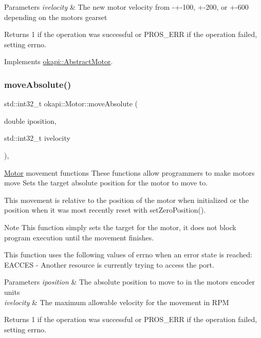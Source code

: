 \begin{DoxyParams}{Parameters}
{\em ivelocity} & The new motor velocity from -\/+-\/100, +-\/200, or +-\/600 depending on the motor\textquotesingle{}s gearset \\
\hline
\end{DoxyParams}
\begin{DoxyReturn}{Returns}
1 if the operation was successful or P\+R\+O\+S\+\_\+\+E\+RR if the operation failed, setting errno. 
\end{DoxyReturn}


Implements \mbox{\hyperlink{classokapi_1_1AbstractMotor_a1d131cbf0b8a325a54034e540c3be6d2}{okapi\+::\+Abstract\+Motor}}.

\mbox{\label{classokapi_1_1Motor_a5f95fd5864805b57f16fa5defdbf1968}} 
\subsubsection{\texorpdfstring{moveAbsolute()}{moveAbsolute()}}
{\footnotesize\ttfamily std\+::int32\+\_\+t okapi\+::\+Motor\+::move\+Absolute (\begin{DoxyParamCaption}\item[{double}]{iposition,  }\item[{std\+::int32\+\_\+t}]{ivelocity }\end{DoxyParamCaption})\hspace{0.3cm}{\ttfamily [override]}, {\ttfamily [virtual]}}

\mbox{\hyperlink{classokapi_1_1Motor}{Motor}} movement functions These functions allow programmers to make motors move Sets the target absolute position for the motor to move to.

This movement is relative to the position of the motor when initialized or the position when it was most recently reset with set\+Zero\+Position().

\begin{DoxyNote}{Note}
This function simply sets the target for the motor, it does not block program execution until the movement finishes.
\end{DoxyNote}
This function uses the following values of errno when an error state is reached\+: E\+A\+C\+C\+ES -\/ Another resource is currently trying to access the port.


\begin{DoxyParams}{Parameters}
{\em iposition} & The absolute position to move to in the motor\textquotesingle{}s encoder units \\
\hline
{\em ivelocity} & The maximum allowable velocity for the movement in R\+PM \\
\hline
\end{DoxyParams}
\begin{DoxyReturn}{Returns}
1 if the operation was successful or P\+R\+O\+S\+\_\+\+E\+RR if the operation failed, setting errno. 
\end{DoxyReturn}


